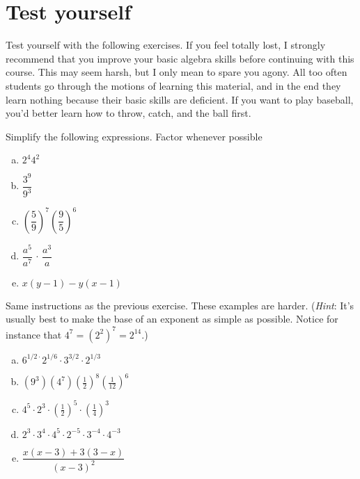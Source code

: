 \section{Test yourself}
Test yourself with the following exercises. If you feel totally lost, I strongly recommend that you improve your basic algebra skills before continuing with this course. This may seem harsh, but I only mean to spare you agony. All too often students go through the motions of learning this material, and in the end they learn nothing because their basic skills are deficient. If you want to play baseball, you'd better learn how to throw, catch, and  the ball first.

\begin{exercise}\label{exercise:BeforeWeBegin:7}
Simplify the following expressions. Factor whenever possible
\begin{multicols}{2}
\begin{enumerate}[(a)]
\item
$ 2^4 4^2$
\item
$ \dfrac{3^9}{9^3}$
\item
$\left( \dfrac{5}{9} \right)^7 \left( \dfrac{9}{5} \right)^6$
\item
$\dfrac{a^5}{a^7} \, \cdot \, \dfrac{a^3}{a}$
\item
$x(y-1) - y(x-1)$
\end{enumerate}
\end{multicols}
\end{exercise}


\begin{exercise}\label{exercise:BeforeWeBegin:8}
Same instructions as the previous exercise. These examples are  harder. (\emph{Hint}: It's usually best to make the base of an exponent as simple as possible. Notice for instance that $4^7 = (2^2)^7 = 2^{14}$.)
\begin{multicols}{2}
\begin{enumerate}[(a)]
\item
$6^{1/2\cdot}2^{1/6}\cdot3^{3/2}\cdot2^{1/3}$
\item
$(9^3)(4^7)\left(\frac{1}{2}\right)^8\left(\frac{1}{12}\right)^6$
\item
$4^5 \cdot 2^3 \cdot \left(\frac{1}{2}\right)^5 \cdot \left( \frac{1}{4} \right) ^3$
\item
$2^3 \cdot 3^4 \cdot 4^5 \cdot 2^{-5} \cdot 3^{-4} \cdot 4^{-3}$
\item
$\dfrac{x(x-3)+3(3-x)}{(x-3)^2}$
\end{enumerate}
\end{multicols}
\end{exercise}


